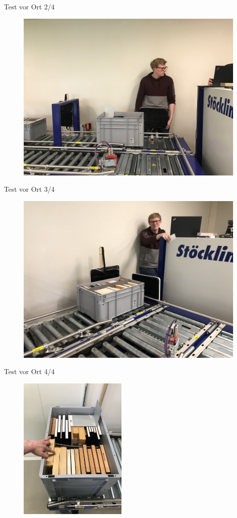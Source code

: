 \documentclass{beamer}
\begin{document}
\begin{frame}{Test vor Ort 2/4}
\begin{figure}[tbh!]
    \centering
    \includegraphics[width=0.8\linewidth]{img/Versuchsaufbau_03}    \label{fig:versuchsaufbau03}
\end{figure}
\end{frame}
\begin{frame}{Test vor Ort 3/4}
\begin{figure}[tbh!]
    \centering
    \includegraphics[width=0.8\linewidth]{img/Versuchsaufbau_01}   \label{fig:versuchsaufbau01}
\end{figure}
\end{frame}
\begin{frame}{Test vor Ort 4/4}
\begin{figure}[tbh!]
    \centering
    \includegraphics[height=7cm]{img/PositionNichtLesbarerTag}   \label{fig:PositionNichtLesbarerTag}
\end{figure}
\end{frame}
\end{document}
